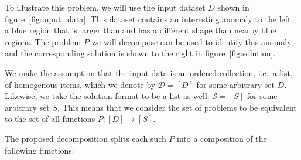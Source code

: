 To illustrate this problem, we will use the input dataset $D$ shown in figure~\ref{fig:input_data}. This dataset contains an interesting anomaly to the left; a blue region that is larger than and has a different shape than nearby blue regions. The problem $P$ we will decompose can be used to identify this anomaly, and the corresponding solution is shown to the right in figure~\ref{fig:solution}.

We make the assumption that the input data is an ordered collection, i.e.\ a list, of homogenous items, which we denote by $\mathcal{D} = [D]$ for some arbitrary set $D$. Likewise, we take the solution format to be a list as well: $\mathcal{S} = [S]$ for some arbitrary set $S$. This means that we consider the set of problems to be equivalent to the set of all functions $P: [D] \rightarrow [S]$.

The proposed decomposition splits each such $P$ into a composition of the following functions:

